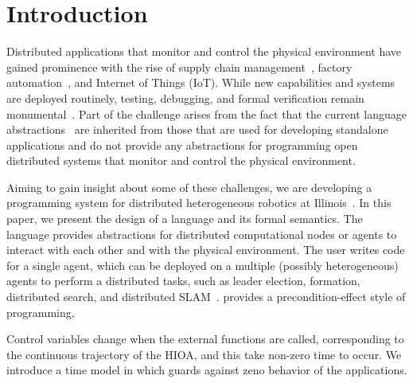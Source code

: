 \section{Introduction}
 Distributed applications that monitor and control the physical environment have gained  prominence with the rise of 
 supply chain management~\cite{kivaFORBES,ref:Wurman08}, factory automation~\cite{dilts1991evolution,ref:Correll08a,greenfield2003software}, and Internet of Things (IoT).
 While new capabilities and systems are deployed routinely,  testing, debugging, and formal verification remain monumental~\cite{geels2006replay,mclurkin2006speaking}.
 Part of the challenge arises from the fact that the current language abstractions~\cite{quigley2009ros,gerkey2003player,blank2003python,corke1996robotics,nesnas2007claraty,nesnas2007claraty2,calisi2008openrdk} are inherited from those that are used for developing standalone applications and  do not provide any abstractions for programming open distributed systems that monitor and control the physical environment. 

Aiming to gain insight about some of these challenges, we are developing a programming system for distributed heterogeneous robotics at Illinois~\cite{ZimMit:2012}. In this paper, we present the design of a language \rolang and its formal semantics. The language provides abstractions for distributed computational nodes or agents to interact with each other and with the physical environment. The user writes code for a single agent, which can be deployed on a multiple (possibly heterogeneous) agents to perform a distributed tasks, such as leader election, formation, distributed search, and distributed SLAM~\cite{cunningham2010ddf}. \rolang provides a  precondition-effect style of programming, 

 Control variables change when the external functions are called, corresponding to the continuous trajectory of the HIOA, and this take non-zero time to occur. We introduce a time model in  which guards against zeno behavior of the applications.  

